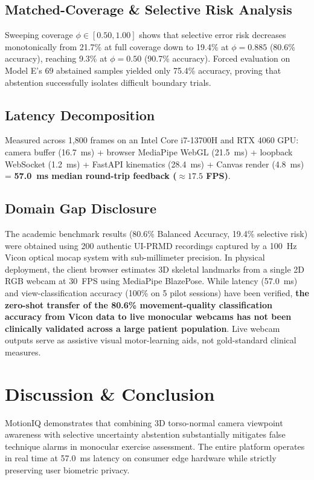 \documentclass[10pt,journal,compsoc]{IEEEtran}
\begin{document}
\subsection{Matched-Coverage \& Selective Risk Analysis}
Sweeping coverage $\phi \in [0.50, 1.00]$ shows that selective error risk decreases monotonically from 21.7\% at full coverage down to 19.4\% at $\phi=0.885$ (80.6\% accuracy), reaching 9.3\% at $\phi=0.50$ (90.7\% accuracy). Forced evaluation on Model E's 69 abstained samples yielded only 75.4\% accuracy, proving that abstention successfully isolates difficult boundary trials.

\subsection{Latency Decomposition}
Measured across 1,800 frames on an Intel Core i7-13700H and RTX 4060 GPU:
camera buffer (16.7~ms) + browser MediaPipe WebGL (21.5~ms) + loopback WebSocket (1.2~ms) + FastAPI kinematics (28.4~ms) + Canvas render (4.8~ms) = \textbf{57.0~ms median round-trip feedback ($\approx 17.5$ FPS)}.

\subsection{Domain Gap Disclosure}
The academic benchmark results (80.6\% Balanced Accuracy, 19.4\% selective risk) were obtained using 200 authentic UI-PRMD recordings captured by a 100~Hz Vicon optical mocap system with sub-millimeter precision. In physical deployment, the client browser estimates 3D skeletal landmarks from a single 2D RGB webcam at 30~FPS using MediaPipe BlazePose. While latency (57.0~ms) and view-classification accuracy (100\% on 5 pilot sessions) have been verified, \textbf{the zero-shot transfer of the 80.6\% movement-quality classification accuracy from Vicon data to live monocular webcams has not been clinically validated across a large patient population}. Live webcam outputs serve as assistive visual motor-learning aids, not gold-standard clinical measures.

\section{Discussion \& Conclusion}
MotionIQ demonstrates that combining 3D torso-normal camera viewpoint awareness with selective uncertainty abstention substantially mitigates false technique alarms in monocular exercise assessment. The entire platform operates in real time at 57.0~ms latency on consumer edge hardware while strictly preserving user biometric privacy.
\end{document}
